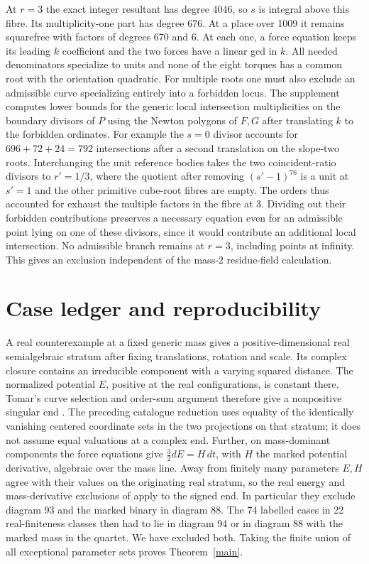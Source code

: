 \documentclass[11pt]{article}
\begin{document}
At $r=3$ the exact integer resultant has degree 4046, so $s$ is integral above this fibre. Its multiplicity-one part has degree 676. At a place over 1009 it remains squarefree with factors of degrees 670 and 6. At each one, a force equation keeps its leading $k$ coefficient and the two forces have a linear gcd in $k$. All needed denominators specialize to units and none of the eight torques has a common root with the orientation quadratic. For multiple roots one must also exclude an admissible curve specializing entirely into a forbidden locus. The supplement computes lower bounds for the generic local intersection multiplicities on the boundary divisors of $P$ using the Newton polygons of $F,G$ after translating $k$ to the forbidden ordinates. For example the $s=0$ divisor accounts for $696+72+24=792$ intersections after a second translation on the slope-two roots. Interchanging the unit reference bodies takes the two coincident-ratio divisors to $r'=1/3$, where the quotient after removing $(s'-1)^{76}$ is a unit at $s'=1$ and the other primitive cube-root fibres are empty. The orders thus accounted for exhaust the multiple factors in the fibre at 3. Dividing out their forbidden contributions preserves a necessary equation even for an admissible point lying on one of these divisors, since it would contribute an additional local intersection. No admissible branch remains at $r=3$, including points at infinity. This gives an exclusion independent of the mass-$2$ residue-field calculation.

\section{Case ledger and reproducibility}
A real counterexample at a fixed generic mass gives a positive-dimensional real semialgebraic stratum after fixing translations, rotation and scale. Its complex closure contains an irreducible component with a varying squared distance. The normalized potential $E$, positive at the real configurations, is constant there. Tomar's curve selection and order-sum argument therefore give a nonpositive singular end \cite[Corollaries 2.4 and 2.7]{Tomar}. The preceding catalogue reduction uses equality of the identically vanishing centered coordinate sets in the two projections on that stratum; it does not assume equal valuations at a complex end. Further, on mass-dominant components the force equations give $\frac32 dE=H\,dt$, with $H$ the marked potential derivative, algebraic over the mass line. Away from finitely many parameters $E,H$ agree with their values on the originating real stratum, so the real energy and mass-derivative exclusions of \cite{Previous} apply to the signed end. In particular they exclude diagram 93 and the marked binary in diagram 88. The 74 labelled cases in 22 real-finiteness classes then had to lie in diagram 94 or in diagram 88 with the marked mass in the quartet. We have excluded both. Taking the finite union of all exceptional parameter sets proves Theorem~\ref{main}.
\end{document}
